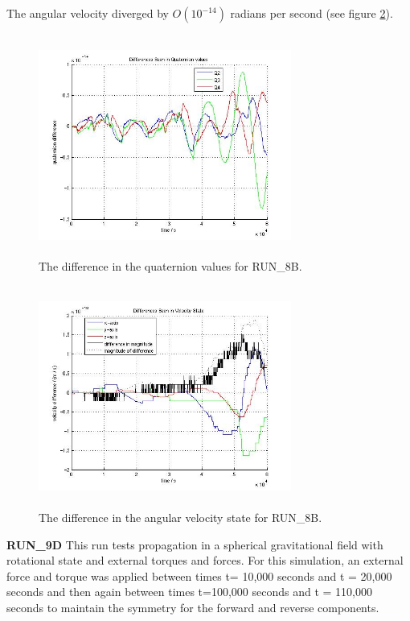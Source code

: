 \begin{description}
The angular velocity diverged by $O(10^{-14})$ radians per second (see figure 
\ref{fig:sim78bvel}).

\begin{figure}[htp]
\begin{center}
\includegraphics[width=3.2736in,height=2.85in]{figures/run8bpos.jpg}
\caption{The difference in the quaternion values for RUN\_8B.}
\label{fig:sim78bpos}
\end{center}
\end{figure}

\begin{figure}[htp]
\begin{center}
\includegraphics[width=3.2736in,height=2.85in]{figures/run8bvel.jpg}
\caption{The difference in the angular velocity state for RUN\_8B.}
\label{fig:sim78bvel}
\end{center}
\end{figure}

\clearpage
{\bf RUN\_9D}
This run tests propagation in a spherical gravitational field with rotational 
state and external torques and forces.  For this simulation, an external force 
and torque was applied between times t= 10,000 seconds and t = 20,000 seconds 
and then again between times t=100,000 seconds and t = 110,000 seconds to 
maintain the symmetry for the forward and reverse components.


\end{description}

